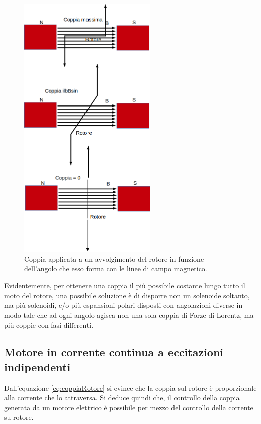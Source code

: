 \documentclass[17pt]{extarticle}
\begin{document}
\begin{figure}[th!]
	\centering
   	\includegraphics[width=2.6in]{coppiaMotoreDC.png}
  	\caption{Coppia applicata a un avvolgimento del rotore in funzione dell'angolo che esso forma con le linee di campo magnetico.}
   	\label{fig:coppiaMotoreDC}
\end{figure}



Evidentemente, per ottenere una coppia il più possibile costante lungo tutto il moto del rotore, una possibile soluzione è di disporre non un solenoide soltanto, ma più solenoidi, e/o più espansioni polari disposti con angolazioni diverse in modo tale che ad ogni angolo agisca non una sola coppia di Forze di Lorentz, ma più coppie con fasi differenti.

\subsection{Motore in corrente continua a eccitazioni indipendenti}


Dall'equazione \ref{eq:coppiaRotore} si evince che la coppia sul rotore è proporzionale alla corrente che lo attraversa. Si deduce quindi che, il controllo della coppia generata da un motore elettrico è possibile per mezzo del controllo della corrente su rotore.
\end{document}
